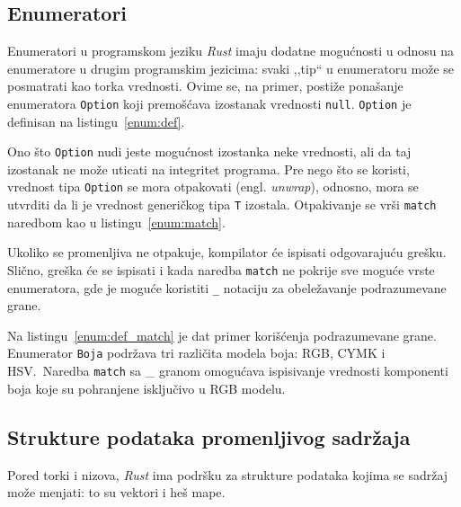 \documentclass[12pt,oneside]{memoir}
\begin{document}
\subsection{Enumeratori}\label{subsec:enum}
Enumeratori u programskom jeziku \emph{Rust} imaju dodatne mogućnosti u odnosu na enumeratore u
drugim programskim jezicima: svaki ,,tip`` u enumeratoru može se posmatrati kao torka vrednosti.
Ovime se, na primer, postiže ponašanje enumeratora \texttt{Option} koji premošćava izostanak vrednosti
\texttt{null}. \texttt{Option} je definisan na listingu~\ref{enum:def}.



Ono što \texttt{Option} nudi jeste mogućnost izostanka neke vrednosti, ali da taj izostanak ne
može uticati na integritet programa. Pre nego što se koristi, vrednost tipa \texttt{Option}
se mora otpakovati (engl. \emph{unwrap}), odnosno, mora se utvrditi da li je vrednost generičkog
tipa \texttt{T} izostala. Otpakivanje se vrši \texttt{match} naredbom kao u
listingu~\ref{enum:match}.



Ukoliko se promenljiva ne otpakuje, kompilator će ispisati odgovarajuću grešku. Slično, greška će
se ispisati i kada naredba \texttt{match} ne pokrije sve moguće vrste enumeratora, gde je moguće
koristiti \texttt{\_} notaciju za obeležavanje podrazumevane grane.

Na listingu~\ref{enum:def_match} je dat primer korišćenja podrazumevane grane.
Enumerator \texttt{Boja} podržava tri različita modela boja: RGB, CYMK i HSV.\
Naredba \texttt{match} sa {\_} granom omogućava
ispisivanje vrednosti komponenti boja koje su pohranjene isključivo u RGB modelu.



\subsection{Strukture podataka promenljivog sadržaja}
Pored torki i nizova, \emph{Rust} ima podršku za strukture podataka kojima se sadržaj
može menjati: to su vektori i heš mape.
\end{document}
